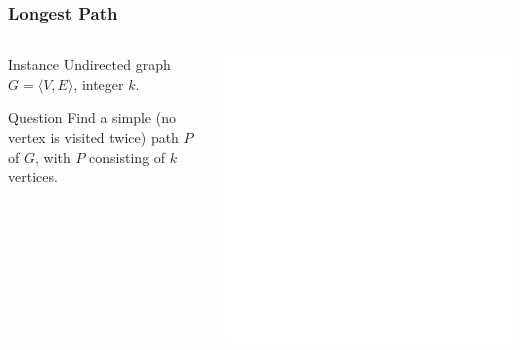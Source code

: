\documentclass[12pt,aspectratio=169]{beamer}
\begin{document}
\begin{frame}\frametitle{Longest Path}
\begin{columns} 
  \begin{column}{0.48\textwidth}
  \begin{block}{Instance}
    Undirected graph $G=\langle V,E \rangle$, integer $k$.
  \end{block}
  \begin{block}{Question}
    Find a simple (no vertex is visited twice) path $P$ of $G$, with $P$ consisting of $k$
    vertices.
%
  \end{block}
\end{column}
    \begin{column}{0.48\textwidth}
      \centering
  \includegraphics[height=0.7\textheight]{img/Grinberg_5CEC_Nonhamiltonian_graph}
\end{column}
\end{columns}
\end{frame}
\end{document}
